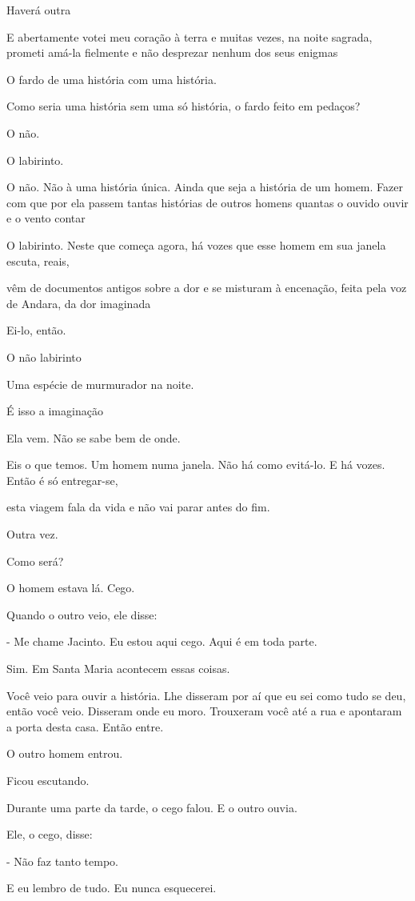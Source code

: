 Haverá outra

E abertamente votei meu coração à terra e muitas vezes, na noite
sagrada, prometi amá-la fielmente e não desprezar nenhum dos seus
enigmas

O fardo de uma história com uma história.

Como seria uma história sem uma só história, o fardo feito em pedaços?

O não.

O labirinto.

O não. Não à uma história única. Ainda que seja a história de um homem.
Fazer com que por ela passem tantas histórias de outros homens quantas o
ouvido ouvir e o vento contar

O labirinto. Neste que começa agora, há vozes que esse homem em sua
janela escuta, reais,

vêm de documentos antigos sobre a dor e se misturam à encenação, feita
pela voz de Andara, da dor imaginada

Ei-lo, então.

O não labirinto

Uma espécie de murmurador na noite.

É isso a imaginação

Ela vem. Não se sabe bem de onde.

Eis o que temos. Um homem numa janela. Não há como evitá-lo. E há vozes.
Então é só entregar-se,

esta viagem fala da vida e não vai parar antes do fim.

Outra vez.

Como será?

O homem estava lá. Cego.

Quando o outro veio, ele disse:

- Me chame Jacinto. Eu estou aqui cego. Aqui é em toda parte.

Sim. Em Santa Maria acontecem essas coisas.

Você veio para ouvir a história. Lhe disseram por aí que eu sei como
tudo se deu, então você veio. Disseram onde eu moro. Trouxeram você até
a rua e apontaram a porta desta casa. Então entre.

O outro homem entrou.

Ficou escutando.

Durante uma parte da tarde, o cego falou. E o outro ouvia.

Ele, o cego, disse:

- Não faz tanto tempo.

E eu lembro de tudo. Eu nunca esquecerei.

